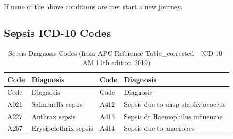 \documentclass[
  a4paper,
  ,captions=tableheading
]{scrartcl}
\begin{document}
If none of the above conditions are met start a new journey.

\newpage

\subsection{Sepsis ICD-10 Codes}\label{sepsis-icd-10-codes}

\begin{longtable}[]{@{}
  >{\centering\arraybackslash}p{}
  >{\raggedright\arraybackslash}p{}
  >{\centering\arraybackslash}p{}
  >{\raggedright\arraybackslash}p{}@{}}
\caption{\label{tbl:tableicd-10}Sepsis Diagnosis Codes (from APC
Reference Table\_corrected - ICD-10-AM 11th edition
2019)}\tabularnewline
\toprule\noalign{}
\begin{minipage}[b]{\linewidth}\centering
Code
\end{minipage} & \begin{minipage}[b]{\linewidth}\raggedright
Diagnosis
\end{minipage} & \begin{minipage}[b]{\linewidth}\centering
Code
\end{minipage} & \begin{minipage}[b]{\linewidth}\raggedright
Diagnosis
\end{minipage} \\
\midrule\noalign{}
\endfirsthead
\toprule\noalign{}
\begin{minipage}[b]{\linewidth}\centering
Code
\end{minipage} & \begin{minipage}[b]{\linewidth}\raggedright
Diagnosis
\end{minipage} & \begin{minipage}[b]{\linewidth}\centering
Code
\end{minipage} & \begin{minipage}[b]{\linewidth}\raggedright
Diagnosis
\end{minipage} \\
\midrule\noalign{}
\endhead
\bottomrule\noalign{}
\endlastfoot
A021 & Salmonella sepsis & A412 & Sepsis due to unsp staphylococcus \\
A227 & Anthrax sepsis & A413 & Sepsis dt Haemophilus influenzae \\
A267 & Erysipelothrix sepsis & A414 & Sepsis due to anaerobes \\

\end{longtable}
\end{document}
